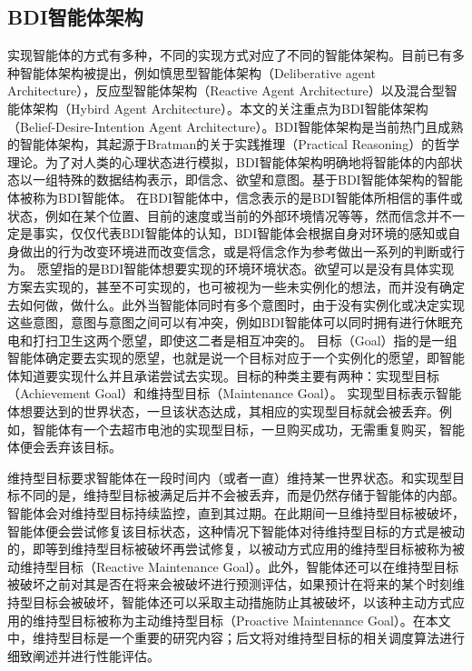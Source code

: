 \subsection{BDI智能体架构}
实现智能体的方式有多种，不同的实现方式对应了不同的智能体架构。目前已有多种智能体架构被提出，例如慎思型智能体架构（Deliberative agent Architecture），反应型智能体架构（Reactive Agent Architecture）以及混合型智能体架构（Hybird Agent Architecture）。本文的关注重点为BDI智能体架构（Belief-Desire-Intention Agent Architecture）。BDI智能体架构是当前热门且成熟的智能体架构，其起源于Bratman的关于实践推理（Practical Reasoning）的哲学理论\cite{bratman1987intention}。为了对人类的心理状态进行模拟，BDI智能体架构明确地将智能体的内部状态以一组特殊的数据结构表示，即信念、欲望和意图。基于BDI智能体架构的智能体被称为BDI智能体。
在BDI智能体中，信念表示的是BDI智能体所相信的事件或状态，例如在某个位置、目前的速度或当前的外部环境情况等等，然而信念并不一定是事实，仅仅代表BDI智能体的认知，BDI智能体会根据自身对环境的感知或自身做出的行为改变环境进而改变信念，或是将信念作为参考做出一系列的判断或行为。
愿望指的是BDI智能体想要实现的环境环境状态。欲望可以是没有具体实现方案去实现的，甚至不可实现的，也可被视为一些未实例化的想法，而并没有确定去如何做，做什么。此外当智能体同时有多个意图时，由于没有实例化或决定实现这些意图，意图与意图之间可以有冲突，例如BDI智能体可以同时拥有进行休眠充电和打扫卫生这两个愿望，即使这二者是相互冲突的。
目标（Goal）指的是一组智能体确定要去实现的愿望，也就是说一个目标对应于一个实例化的愿望，即智能体知道要实现什么并且承诺尝试去实现。目标的种类主要有两种：实现型目标（Achievement Goal）和维持型目标（Maintenance Goal）。
实现型目标表示智能体想要达到的世界状态，一旦该状态达成，其相应的实现型目标就会被丢弃。例如，智能体有一个去超市电池的实现型目标，一旦购买成功，无需重复购买，智能体便会丢弃该目标。

维持型目标要求智能体在一段时间内（或者一直）维持某一世界状态。和实现型目标不同的是，维持型目标被满足后并不会被丢弃，而是仍然存储于智能体的内部。智能体会对维持型目标持续监控，直到其过期。在此期间一旦维持型目标被破坏，智能体便会尝试修复该目标状态，这种情况下智能体对待维持型目标的方式是被动的，即等到维持型目标被破坏再尝试修复，以被动方式应用的维持型目标被称为被动维持型目标（Reactive Maintenance Goal）。此外，智能体还可以在维持型目标被破坏之前对其是否在将来会被破坏进行预测评估，如果预计在将来的某个时刻维持型目标会被破坏，智能体还可以采取主动措施防止其被破坏，以该种主动方式应用的维持型目标被称为主动维持型目标（Proactive Maintenance Goal）。在本文中，维持型目标是一个重要的研究内容；后文将对维持型目标的相关调度算法进行细致阐述并进行性能评估。

